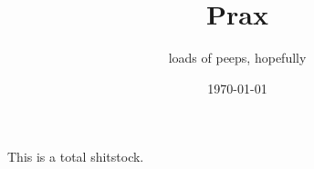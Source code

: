\documentclass{article}
\title{Prax}
\date{\today}
\author{loads of peeps, hopefully}
\begin{document}
        \maketitle


        This is a total shitstock.
\end{document}
